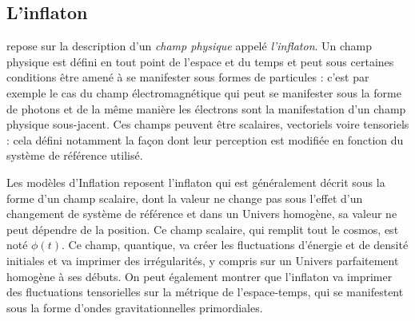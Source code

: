 \subsection{L'inflaton}
 repose sur la description d'un \textit{champ physique} appelé \textit{l'inflaton}. Un champ physique est défini en tout point de l'espace et du temps et peut sous certaines conditions être amené à se manifester sous formes de particules : c'est par exemple le cas du champ électromagnétique qui peut se manifester sous la forme de photons et de la même manière les électrons sont la manifestation d'un champ physique sous-jacent. Ces champs peuvent être scalaires, vectoriels voire tensoriels : cela défini notamment la façon dont leur perception est modifiée en fonction du système de référence utilisé.

Les modèles d'Inflation reposent l'inflaton qui est généralement décrit sous la forme d'un champ scalaire, dont la valeur ne change pas sous l'effet d'un changement de système de référence et dans un Univers homogène, sa valeur ne peut dépendre de la position. Ce champ scalaire, qui remplit tout le cosmos, est noté $\phi(t)$. Ce champ, quantique, va créer les fluctuations d'énergie et de densité initiales et va imprimer des irrégularités, y compris sur un Univers parfaitement homogène à ses débuts. On peut également montrer que l'inflaton va imprimer des fluctuations tensorielles sur la métrique de l'espace-temps, qui se manifestent sous la forme d'ondes gravitationnelles primordiales.

